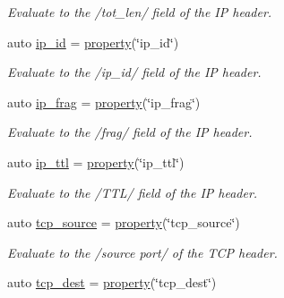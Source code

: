 \begin{DoxyCompactItemize}
\begin{DoxyCompactList}\small\item\em Evaluate to the /tot\+\_\+len/ field of the I\+P header. \end{DoxyCompactList}\item 
auto \hyperlink{namespacepfq_1_1lang_1_1anonymous__namespace_02default_8hpp_03_a87620275a9e9760978d5660be0582852}{ip\+\_\+id} = \hyperlink{namespacepfq_1_1lang_a3f461785d825c3f5e024dd65c18ea3dc}{property}(\char`\"{}ip\+\_\+id\char`\"{})
\begin{DoxyCompactList}\small\item\em Evaluate to the /ip\+\_\+id/ field of the I\+P header. \end{DoxyCompactList}\item 
auto \hyperlink{namespacepfq_1_1lang_1_1anonymous__namespace_02default_8hpp_03_a46050d7137792fba0ca6d1b9cb75ad0d}{ip\+\_\+frag} = \hyperlink{namespacepfq_1_1lang_a3f461785d825c3f5e024dd65c18ea3dc}{property}(\char`\"{}ip\+\_\+frag\char`\"{})
\begin{DoxyCompactList}\small\item\em Evaluate to the /frag/ field of the I\+P header. \end{DoxyCompactList}\item 
auto \hyperlink{namespacepfq_1_1lang_1_1anonymous__namespace_02default_8hpp_03_a885339d6e5b34ec5d037e085dfba9851}{ip\+\_\+ttl} = \hyperlink{namespacepfq_1_1lang_a3f461785d825c3f5e024dd65c18ea3dc}{property}(\char`\"{}ip\+\_\+ttl\char`\"{})
\begin{DoxyCompactList}\small\item\em Evaluate to the /\+T\+T\+L/ field of the I\+P header. \end{DoxyCompactList}\item 
auto \hyperlink{namespacepfq_1_1lang_1_1anonymous__namespace_02default_8hpp_03_a367a9ec6d91677553073c54a059b391d}{tcp\+\_\+source} = \hyperlink{namespacepfq_1_1lang_a3f461785d825c3f5e024dd65c18ea3dc}{property}(\char`\"{}tcp\+\_\+source\char`\"{})
\begin{DoxyCompactList}\small\item\em Evaluate to the /source port/ of the T\+C\+P header. \end{DoxyCompactList}\item 
auto \hyperlink{namespacepfq_1_1lang_1_1anonymous__namespace_02default_8hpp_03_a83741c074712431d2e75f09744bb7486}{tcp\+\_\+dest} = \hyperlink{namespacepfq_1_1lang_a3f461785d825c3f5e024dd65c18ea3dc}{property}(\char`\"{}tcp\+\_\+dest\char`\"{})

\end{DoxyCompactItemize}
